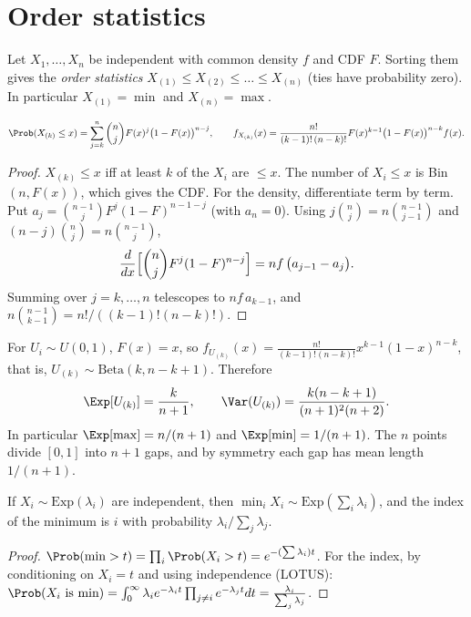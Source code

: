 \section{Order statistics}

Let $X_1,\dots,X_n$ be independent with common density $f$ and CDF $F$. Sorting
them gives the \emph{order statistics}
$X_{(1)}\le X_{(2)}\le\dots\le X_{(n)}$ (ties have probability zero). In
particular $X_{(1)}=\min$ and $X_{(n)}=\max$.

\begin{theorem}\label{thm:orderstat}
\[
\Prob(X_{(k)}\le x)=\sum_{j=k}^n\binom nj F(x)^j\bigl(1-F(x)\bigr)^{n-j},
\qquad
f_{X_{(k)}}(x)=\frac{n!}{(k-1)!\,(n-k)!}F(x)^{k-1}\bigl(1-F(x)\bigr)^{n-k}f(x).
\]
\end{theorem}
\begin{proof}
$X_{(k)}\le x$ iff at least $k$ of the $X_i$ are $\le x$. The number of $X_i\le x$ is
Bin$(n,F(x))$, which gives the CDF. For the density, differentiate term by term. Put
$a_j=\binom{n-1}jF^j(1-F)^{n-1-j}$ (with $a_n=0$). Using
$j\binom nj=n\binom{n-1}{j-1}$ and $(n-j)\binom nj=n\binom{n-1}{j}$,
\[
\frac d{dx}\Bigl[\binom njF^j(1-F)^{n-j}\Bigr]
=nf\,\bigl(a_{j-1}-a_j\bigr).
\]
Summing over $j=k,\dots,n$ telescopes to $nf\,a_{k-1}$, and
$n\binom{n-1}{k-1}=n!/((k-1)!(n-k)!)$.
\end{proof}

\begin{example}\label{ex:unifos}
For $U_i\sim U(0,1)$, $F(x)=x$, so
$f_{U_{(k)}}(x)=\frac{n!}{(k-1)!(n-k)!}x^{k-1}(1-x)^{n-k}$, that is,
$U_{(k)}\sim\mathrm{Beta}(k,n-k+1)$. Therefore
\[
\Exp[U_{(k)}]=\frac k{n+1},\qquad\Var(U_{(k)})=\frac{k(n-k+1)}{(n+1)^2(n+2)} .
\]
In particular $\Exp[\max]=n/(n+1)$ and $\Exp[\min]=1/(n+1)$. The $n$ points divide
$[0,1]$ into $n+1$ gaps, and by symmetry each gap has mean length $1/(n+1)$.
\end{example}

\begin{theorem}\label{thm:minexp}
If $X_i\sim\mathrm{Exp}(\lambda_i)$ are independent, then
$\min_iX_i\sim\mathrm{Exp}(\sum_i\lambda_i)$, and the index of the minimum is $i$
with probability $\lambda_i/\sum_j\lambda_j$.
\end{theorem}
\begin{proof}
$\Prob(\min>t)=\prod_i\Prob(X_i>t)=e^{-(\sum\lambda_i)t}$. For the index, by
conditioning on $X_i=t$ and using independence (LOTUS):
$\Prob(X_i\text{ is min})=\int_0^\infty\lambda_ie^{-\lambda_it}\prod_{j\ne i}e^{-\lambda_jt}dt=
\frac{\lambda_i}{\sum_j\lambda_j}$.
\end{proof}

